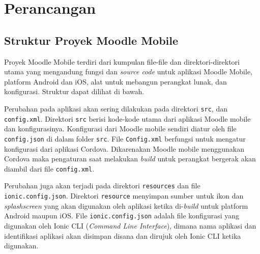 \chapter{Perancangan}
\label{perancangan} 

\section{Struktur Proyek Moodle Mobile}
\label{struktur proyek}

Proyek Moodle Mobile terdiri dari kumpulan file-file dan direktori-direktori utama yang mengandung fungsi dan \textit{source code} untuk aplikasi Moodle Mobile, platform Android dan iOS, alat untuk mebangun perangkat lunak, dan konfigurasi. Struktur dapat dilihat di bawah.
\\


Perubahan pada aplikasi akan sering dilakukan pada direktori \texttt{src}, dan \texttt{config.xml}. Direktori \texttt{src} berisi kode-kode utama dari aplikasi Moodle mobile dan konfigurasinya. Konfigurasi dari Moodle mobile sendiri diatur oleh file \texttt{config.json} di dalam folder \texttt{src}. File \texttt{Config.xml} berfungsi untuk mengatur konfigurasi dari aplikasi Cordova. Dikarenakan Moodle mobile menggunakan Cordova maka pengaturan saat melakukan \textit{build} untuk perangkat bergerak akan diambil dari file \texttt{config.xml}. 

Perubahan juga akan terjadi pada direktori \texttt{resources} dan file \texttt{ionic.config.json}. Direktori \texttt{resource} menyimpan sumber untuk ikon dan \textit{splashscreen} yang akan digunakan oleh aplikasi ketika di-\textit{build} untuk platform Android maupun iOS. File \texttt{ionic.config.json} adalah file konfigurasi yang digunakan oleh  Ionic CLI (\textit{Command Line Interface}), dimana nama aplikasi dan identifikasi aplikasi akan disimpan disana dan dirujuk oleh Ionic CLI ketika digunakan.

